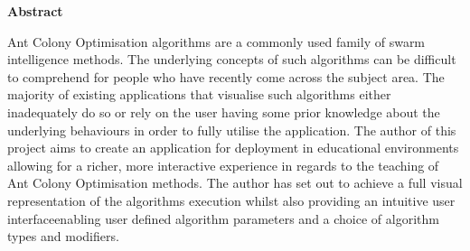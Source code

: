 \thispagestyle{empty}

\begin{center}
    {\LARGE\bf Abstract}
\end{center}
Ant Colony Optimisation algorithms are a commonly used family of swarm intelligence methods. The underlying concepts of such algorithms can be difficult to comprehend for people who have recently come across the subject area. The majority of existing applications that visualise such algorithms either inadequately do so or rely on the user having some prior knowledge about the underlying behaviours in order to fully utilise the application. The author of this project aims to create an application for deployment in educational environments allowing for a richer, more interactive experience in regards to the teaching of Ant Colony Optimisation methods. The author has set out to achieve a full visual representation of the algorithms execution whilst also providing an intuitive user interfaceenabling user defined algorithm parameters and a choice of algorithm types and modifiers.